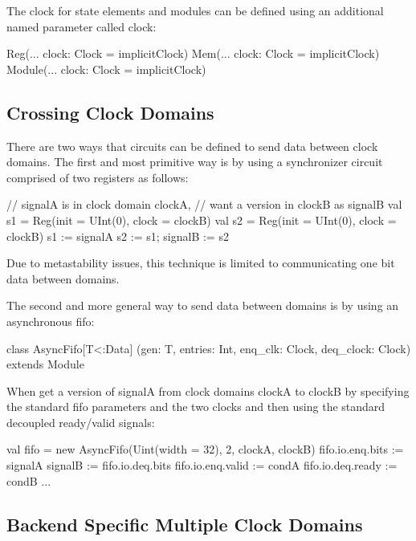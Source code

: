 \documentclass[twocolumn,10pt]{article}
\begin{document}
The clock for state elements and modules can be defined using an additional named parameter called clock:

\begin{scala}
Reg(... clock: Clock = implicitClock)
Mem(... clock: Clock = implicitClock)
Module(... clock: Clock = implicitClock)
\end{scala}

\subsection{Crossing Clock Domains}

There are two ways that circuits can be defined to send data between clock domains.
The first and most primitive way is by using a synchronizer circuit comprised of two registers as follows:

\begin{scala}
// signalA is in clock domain clockA, 
// want a version in clockB as signalB
val s1 = Reg(init = UInt(0), clock = clockB)
val s2 = Reg(init = UInt(0), clock = clockB)
s1      := signalA
s2      := s1; 
signalB := s2
\end{scala}

\noindent
Due to metastability issues, this technique is limited to communicating one bit data between domains.

The second and more general way to send data between domains is by using an asynchronous fifo:

\begin{scala}
class AsyncFifo[T<:Data]
    (gen: T, entries: Int, enq_clk: Clock, deq_clock: Clock)
  extends Module
\end{scala}

\noindent
When get a version of signalA from clock domains clockA to clockB by
specifying the standard fifo parameters and the two clocks and then using the
standard decoupled ready/valid signals:

\begin{scala}
val fifo =
  new AsyncFifo(Uint(width = 32), 2, clockA, clockB)
fifo.io.enq.bits  := signalA
signalB           := fifo.io.deq.bits
fifo.io.enq.valid := condA
fifo.io.deq.ready := condB
...
\end{scala}

\subsection{Backend Specific Multiple Clock Domains}
\end{document}
